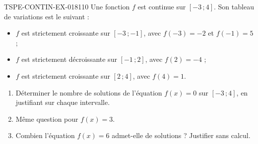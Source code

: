 \begin{exercice}{TSPE-CONTIN-EX-018}{1}{10}
Une fonction $f$ est continue sur $[-3\,;4]$. Son tableau de variations est le suivant :
\begin{itemize}
  \item $f$ est strictement croissante sur $[-3\,;-1]$, avec $f(-3) = -2$ et $f(-1) = 5$ ;
  \item $f$ est strictement décroissante sur $[-1\,;2]$, avec $f(2) = -4$ ;
  \item $f$ est strictement croissante sur $[2\,;4]$, avec $f(4) = 1$.
\end{itemize}
\begin{enumerate}
  \item Déterminer le nombre de solutions de l'équation $f(x) = 0$ sur $[-3\,;4]$, en justifiant sur chaque intervalle.
  \item Même question pour $f(x) = 3$.
  \item Combien l'équation $f(x) = 6$ admet-elle de solutions ? Justifier sans calcul.
\end{enumerate}
\end{exercice}
